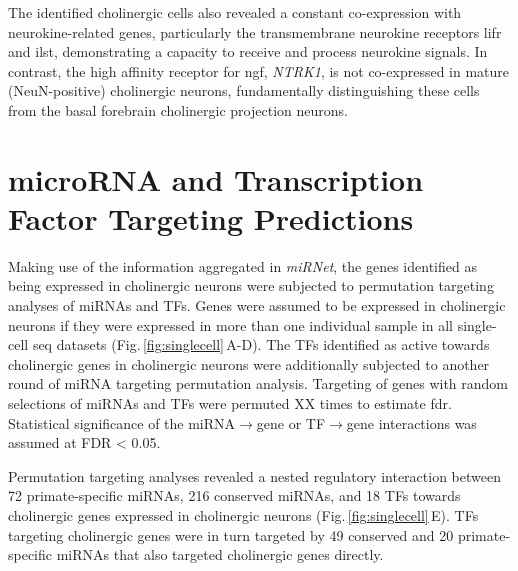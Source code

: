 The identified cholinergic cells also revealed a constant co-expression with neurokine-related genes, particularly the transmembrane neurokine receptors \ac{lifr} and \ac{ilst}, demonstrating a capacity to receive and process neurokine signals. In contrast, the high affinity receptor for \ac{ngf}, \textit{NTRK1}, is not co-expressed in mature (NeuN-positive) cholinergic neurons, fundamentally distinguishing these cells from the basal forebrain cholinergic projection neurons.

\section{microRNA and Transcription Factor Targeting Predictions}
\begin{method}
Making use of the information aggregated in \emph{miRNet}, the genes identified as being expressed in cholinergic neurons were subjected to permutation targeting analyses of miRNAs and TFs. Genes were assumed to be expressed in cholinergic neurons if they were expressed in more than one individual sample in all single-cell \ac{seq} datasets (Fig.\,\ref{fig:singlecell}\,A-D). The TFs identified as active towards cholinergic genes in cholinergic neurons were additionally subjected to another round of miRNA targeting permutation analysis. Targeting of genes with random selections of miRNAs and TFs were permuted XX times to estimate \ac{fdr}. Statistical significance of the miRNA$\to$gene or TF$\to$gene interactions was assumed at FDR < 0.05.
\end{method}

Permutation targeting analyses revealed a nested regulatory interaction between 72 primate-specific miRNAs, 216 conserved miRNAs, and 18 TFs towards cholinergic genes expressed in cholinergic neurons (Fig.\,\ref{fig:singlecell}\,E). TFs targeting cholinergic genes were in turn targeted by 49 conserved and 20 primate-specific miRNAs that also targeted cholinergic genes directly.

